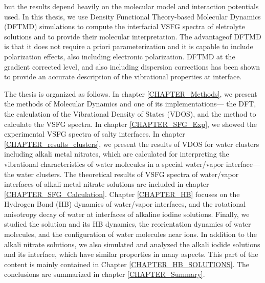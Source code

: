 but the results depend heavily on the molecular model and interaction potentials used. \cite{LXD03,MKP04,TI07,MM05}
In this thesis, we use Density Functional Theory-based Molecular Dynamics (DFTMD) simulations to compute 
the interfacial VSFG spectra of eletrolyte solutions and to provide their molecular interpretation.
The advantageof DFTMD is that it does not require a priori parameterization and it is capable to include polarization effects, \cite{Ufimtsev2011}
also including electronic polarization. DFTMD at the gradient corrected level, and also including dispersion corrections \cite{Grimme04,Grimme06,Grimme07,Grimme10,Baer2011}
has been shown to provide an accurate description of the vibrational properties at interface. \cite{Fornaro2015}

The thesis is organized as follows. 
In chapter \ref{CHAPTER_Methods}, we present the methods of \abinitio Molecular Dynamics and one of its implementations--- 
the DFT, the calculation of the Vibrational Density of States (VDOS), and the method to calculate the VSFG spectra.
In chapter \ref{CHAPTER_SFG_Exp}, we showed the experimental VSFG spectra of salty interfaces.
In chapter \ref{CHAPTER_results_clusters}, we present the results of VDOS for water clusters including alkali metal nitrates, 
 which are calculated for interpreting the vibrational characteristics of water molecules in a special water/vapor interface---the water clusters.
The theoretical results of VSFG spectra of water/vapor interfaces of alkali metal nitrate solutions are included in chapter \ref{CHAPTER_SFG_Calculation}. 
Chapter \ref{CHAPTER_HB} focuses on the Hydrogen Bond (HB) dynamics of water/vapor interfaces, 
and the rotational anisotropy decay of water at interfaces of alkaline iodine solutions. 
Finally, we studied the solution and its HB dynamics, the reorientation dynamics of water molecules, and the configuration 
of water molecules near ions.
In addition to the alkali nitrate solutions, we also simulated and analyzed the alkali iodide solutions and its interface, which have similar properties in many aspects. 
This part of the content is mainly contained in Chapter \ref{CHAPTER_HB_SOLUTIONS}.
The conclusions are summarized in chapter \ref{CHAPTER_Summary}.
